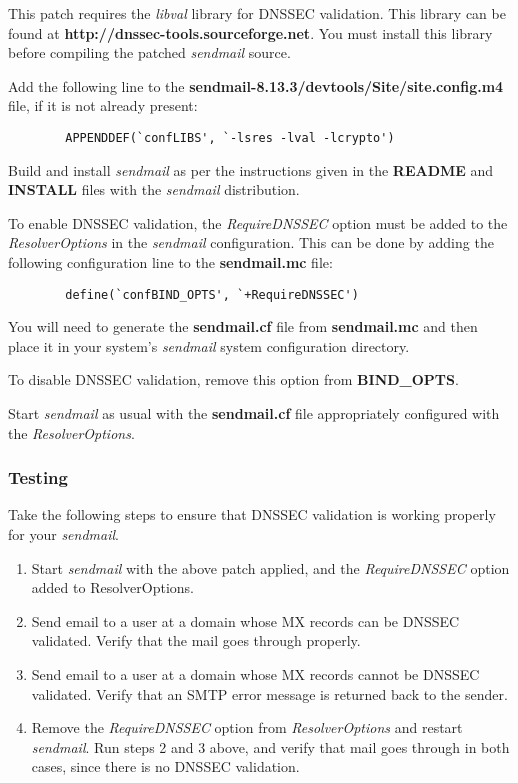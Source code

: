 \documentclass[12pt]{article}
\newcommand{\cmd}[1]{{\em #1}}
\newcommand{\const}[1]{{\bf #1}}
\newcommand{\lib}[1]{{\em #1}}
\newcommand{\path}[1]{{\bf #1}}
\newcommand{\url}[1]{{\bf #1}}
\newcommand{\var}[1]{{\em #1}}
\begin{document}
This patch requires the \lib{libval} library for DNSSEC validation.  This
library can be found at \url{http://dnssec-tools.sourceforge.net}.  You must
install this library before compiling the patched \cmd{sendmail} source.

Add the following line to the
\path{sendmail-8.13.3/devtools/Site/site.config.m4} file,
if it is not already present:

\begin{verbatim}
        APPENDDEF(`confLIBS', `-lsres -lval -lcrypto')
\end{verbatim}

Build and install \cmd{sendmail} as per the instructions given in the
\path{README} and \path{INSTALL} files with the \cmd{sendmail} distribution.

To enable DNSSEC validation, the \var{RequireDNSSEC} option must be added to
the \var{ResolverOptions} in the \cmd{sendmail} configuration.  This can be
done by adding the following configuration line to the \path{sendmail.mc}
file:

\begin{verbatim}
        define(`confBIND_OPTS', `+RequireDNSSEC')
\end{verbatim}

You will need to generate the \path{sendmail.cf} file from \path{sendmail.mc}
and then place it in your system's \cmd{sendmail} system configuration
directory.

To disable DNSSEC validation, remove this option from \const{BIND\_OPTS}.

Start \cmd{sendmail} as usual with the \path{sendmail.cf} file appropriately
configured with the \var{ResolverOptions}.


\subsubsection{Testing}

Take the following steps to ensure that DNSSEC validation is working properly
for your \cmd{sendmail}. 

\begin{enumerate}

\item Start \cmd{sendmail} with the above patch applied,
and the \var{RequireDNSSEC} option added to ResolverOptions.

\item Send email to a user at a domain whose MX records can be DNSSEC
validated.  Verify that the mail goes through properly.

\item Send email to a user at a domain whose MX records cannot be DNSSEC
validated.  Verify that an SMTP error message is returned back to the sender.

\item Remove the \var{RequireDNSSEC} option from \var{ResolverOptions} and
restart \cmd{sendmail}.   Run steps 2 and 3 above, and verify that mail goes
through in both cases, since there is no DNSSEC validation.

\end{enumerate}
\end{document}
